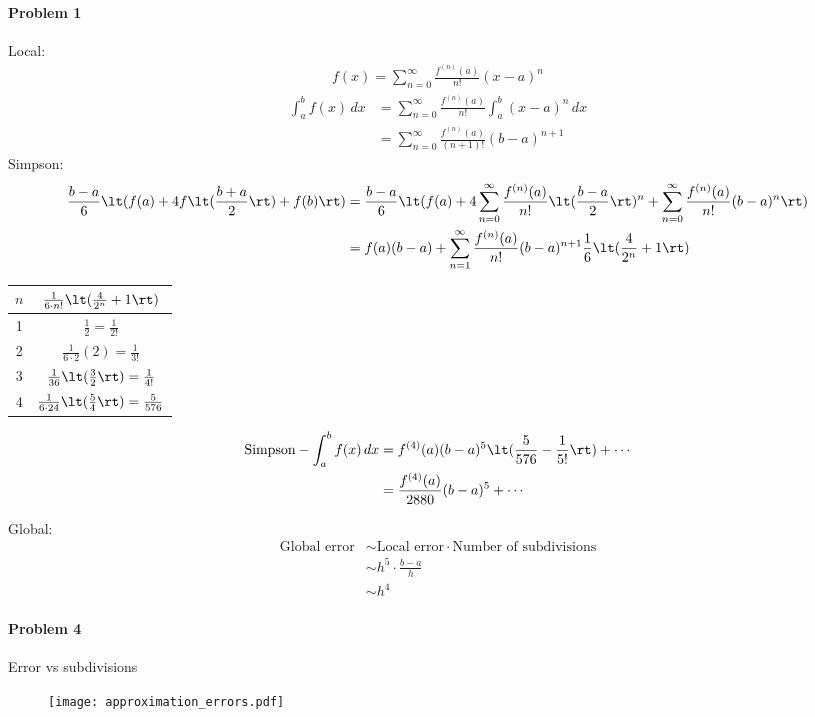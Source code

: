 \documentclass[12pt, oneside, letterpaper, fleqn]{article}
\begin{document}
\paragraph{Problem 1}
Local:
\begin{align*}
f(x) = \sum_{n=0}^\infty \frac{f^{(n)}(a)}{n!}(x-a)^n
\end{align*}
\begin{align*}
\int_a^b f(x)\,dx &= \sum_{n=0}^\infty \frac{f^{(n)}(a)}{n!} \int_a^b
(x-a)^n\,dx\\
&= \sum_{n=0}^\infty \frac{f^{(n)}(a)}{(n+1)!} (b-a)^{n+1}
\end{align*}
Simpson:
\begin{align*}
\frac{b-a}{6}\lt(f(a) + 4f\lt(\frac{b+a}{2}\rt) + f(b)\rt)
&= \frac{b-a}{6}\lt(f(a) + 4\sum_{n=0}^\infty \frac{f^{(n)}(a)}{n!}
\lt(\frac{b-a}{2}\rt)^n + \sum_{n=0}^\infty \frac{f^{(n)}(a)}{n!}
(b-a)^n \rt)\\
&= f(a)(b-a) + \sum_{n=1}^\infty \frac{f^{(n)}(a)}{n!}(b-a)^{n+1}
\frac{1}{6}\lt(\frac{4}{2^n} + 1\rt)
\end{align*}
\begin{table}[htbp]
\renewcommand{\arraystretch}{2}
\begin{tabular}{c | c}
\hline\hline
$n$ & $\frac{1}{6 \cdot n!}\lt(\frac{4}{2^n}+1\rt)$\\
\hline
1 & $\frac{1}{2} = \frac{1}{2!}$\\
2 & $\frac{1}{6\cdot 2}(2) = \frac{1}{3!}$\\
3 & $\frac{1}{36}\lt(\frac{3}{2}\rt) = \frac{1}{4!}$\\
4 & $\frac{1}{6\cdot 24}\lt(\frac{5}{4}\rt) = \frac{5}{576}$\\
\hline
\end{tabular}
\end{table}

\begin{align*}
\text{Simpson} - \int_a^b f(x)\,dx &= f^{(4)}(a)(b-a)^{5}
\lt(\frac{5}{576} - \frac{1}{5!}\rt) + \dotsb\\
&= \frac{f^{(4)}(a)}{2880} (b-a)^{5} + \dotsb
\end{align*}

Global:
\begin{align*}
\text{Global error} &\sim \text{Local error} \cdot \text{Number of
subdivisions}\\
&\sim h^5 \cdot \frac{b-a}{h}\\
&\sim h^4
\end{align*}

\pagebreak
\paragraph{Problem 4}
Error vs subdivisions
\begin{figure}[htbp]
\texttt{[image: approximation\_errors.pdf]}
\end{figure}


\end{document}

